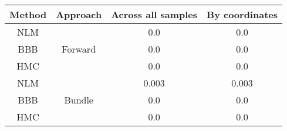 \documentclass[convert={outext=.png}]{standalone}
\begin{document}
\centering
\label{tab:experimental_results}

\begin{tabular}{c c c c}

\hline
\hline
 Method & Approach & Across all samples & By coordinates \\ \hline
 NLM & \multirow{3}{*}{Forward} & 0.0 & 0.0 \\
 BBB &  & 0.0 & 0.0 \\
 HMC &  & 0.0 & 0.0 \\
 \hline
 NLM & \multirow{3}{*}{Bundle} & 0.003 & 0.003 \\
 BBB &  & 0.0 & 0.0 \\
 HMC &  & 0.0 & 0.0 \\
\hline
\hline
\end{tabular}
\end{document}
